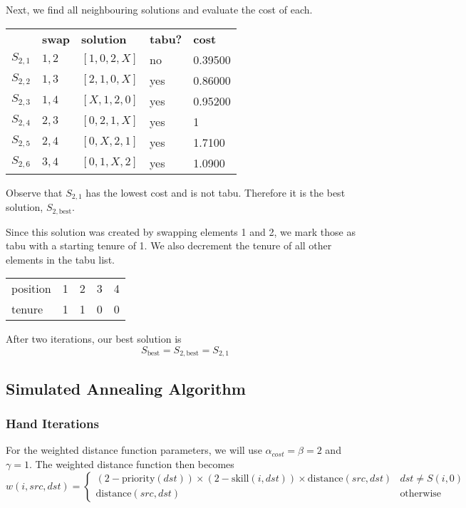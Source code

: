 \documentclass[a4paper]{article}
\begin{document}
Next, we find all neighbouring solutions and evaluate the cost of each.

\begin{tabular}{lllll}
& \textbf{swap}   & \textbf{solution}    & \textbf{tabu?} & \textbf{cost}  \\

$S_{2,1}$ & $1,2$ & $[1, 0, 2, X]$ & no  & 0.39500 \\
$S_{2,2}$ & $1,3$ & $[2, 1, 0, X]$ & yes & 0.86000 \\
$S_{2,3}$ & $1,4$ & $[X, 1, 2, 0]$ & yes & 0.95200 \\
$S_{2,4}$ & $2,3$ & $[0, 2, 1, X]$ & yes & 1       \\
$S_{2,5}$ & $2,4$ & $[0, X, 2, 1]$ & yes & 1.7100  \\
$S_{2,6}$ & $3,4$ & $[0, 1, X, 2]$ & yes & 1.0900  \\
\end{tabular}

Observe that $S_{2,1}$ has the lowest cost and is not tabu. Therefore it is the best solution, $S_{2, \text{best}}$.

Since this solution was created by swapping elements 1 and 2, we mark those as tabu with a starting tenure of 1. We also decrement the tenure of all other elements in the tabu list.

\begin{tabular}{lllll}
position & 1 & 2 & 3 & 4 \\
tenure   & 1 & 1 & 0 & 0
\end{tabular}
\vspace{1.5em}

After two iterations, our best solution is
$$S_{\text{best}} = S_{2, \text{best}} = S_{2,1}$$

\subsection{Simulated Annealing Algorithm} %

\subsubsection{Hand Iterations}

For the weighted distance function parameters, we will use $\alpha_{cost} = \beta = 2$ and $\gamma = 1$. The weighted distance function then becomes
$$
w(i, \mathit{src}, \mathit{dst}) = \begin{cases}
(2 - \text{priority}(\mathit{dst})) \times (2 - \text{skill}(i, \mathit{dst})) \times \text{distance}(\mathit{src}, \mathit{dst}) & \mathit{dst} \ne S(i,0) \\
\text{distance}(\mathit{src}, \mathit{dst}) & \text{otherwise}
\end{cases}
$$
\end{document}
